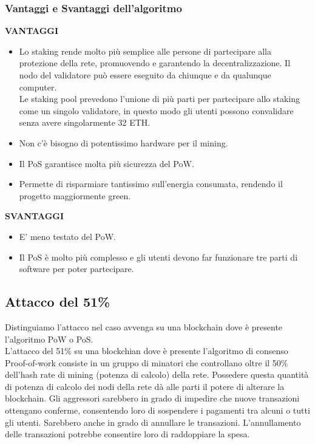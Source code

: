 \documentclass[a4paper,11pt]{report}
\begin{document}
\subsubsection{Vantaggi e Svantaggi dell'algoritmo}
\textbf{VANTAGGI}\\
\begin{itemize}
\item Lo staking rende molto più semplice alle persone di partecipare alla protezione della rete, promuovendo e garantendo la decentralizzazione. Il nodo del validatore può essere eseguito da chiunque e da qualunque computer.\\ Le staking pool prevedono l’unione di più parti per partecipare allo staking come un singolo validatore, in questo modo gli utenti possono convalidare senza avere singolarmente 32 ETH.
\item Non c'è bisogno di potentissimo hardware per il mining.
\item Il PoS garantisce molta più sicurezza del PoW.
\item Permette di risparmiare tantissimo sull'energia consumata, rendendo il progetto maggiormente green.
\end{itemize}
\textbf{SVANTAGGI}
\begin{itemize}
\item E' meno testato del PoW.
\item Il PoS è molto più complesso e gli utenti devono far funzionare tre parti di software per poter partecipare.
\end{itemize}


\subsection{Attacco del 51\%}
Distinguiamo l'attacco nel caso avvenga su una blockchain dove è presente l'algoritmo PoW o PoS.\\
L'attacco del 51\% su una blockchian dove è presente l'algoritmo di consenso Proof-of-work consiste in un gruppo di minatori che controllano oltre il 50\% dell'hash rate di mining (potenza di calcolo) della rete. Possedere questa quantità di potenza di calcolo dei nodi della rete dà alle parti il potere di alterare la blockchain.
Gli aggressori sarebbero in grado di impedire che nuove transazioni ottengano conferme, consentendo loro di sospendere i pagamenti tra alcuni o tutti gli utenti. Sarebbero anche in grado di annullare le transazioni. L'annullamento delle transazioni potrebbe consentire loro di raddoppiare la spesa. \\
\end{document}
